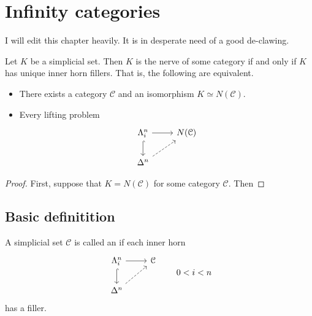 \documentclass[main.tex]{subfiles}
\begin{document}
\newcommand{\ssmash}{\overset{\star}{\wedge}}

\chapter{Infinity categories}
\label{ch:infinity_categories}

\begin{note}
  I will edit this chapter heavily. It is in desperate need of a good de-clawing.
\end{note}

\begin{lemma}
  Let $K$ be a simplicial set. Then $K$ is the nerve of some category if and only if $K$ has unique inner horn fillers. That is, the following are equivalent.
  \begin{itemize}
    \item There exists a category $\mathcal{C}$ and an isomorphism $K \simeq N(\mathcal{C})$.

    \item Every lifting problem
      \begin{equation*}
        \begin{tikzcd}
          \Lambda^{n}_{i}
          \arrow[r]
          \arrow[d, hookrightarrow]
          & N(\mathcal{C})
          \\
          \Delta^{n}
          \arrow[ur, dashed]
        \end{tikzcd}
      \end{equation*}
  \end{itemize}
\end{lemma}
\begin{proof}
  First, suppose that $K = N(\mathcal{C})$ for some category $\mathcal{C}$. Then
\end{proof}

\section{Basic definitition}
\label{sec:basic_definitions_infinity_categories}

\begin{definition}
  \label{def:infinity_category}
  A simplicial set $\mathcal{C}$ is called an  if each inner horn
  \begin{equation*}
    \begin{tikzcd}
      \Lambda^{n}_{i}
      \arrow[r]
      \arrow[d, hookrightarrow]
      & \mathcal{C}
      \\
      \Delta^{n}
      \arrow[ur, dashed]
    \end{tikzcd}
    \qquad 0 < i < n
  \end{equation*}
  has a filler.
\end{definition}
\end{document}
